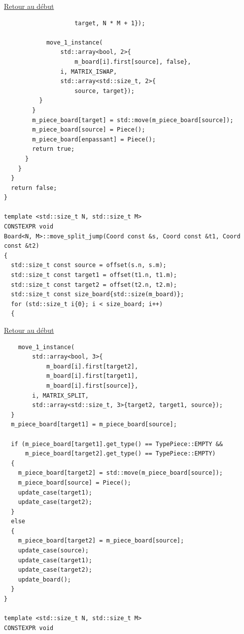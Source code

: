 {\begin{frame}[fragile]
\hyperlink{conclusion}{Retour au début}\newline
\begin{verbatim}
                    target, N * M + 1});

            move_1_instance(
                std::array<bool, 2>{
                    m_board[i].first[source], false},
                i, MATRIX_ISWAP,
                std::array<std::size_t, 2>{
                    source, target});
          }
        }
        m_piece_board[target] = std::move(m_piece_board[source]);
        m_piece_board[source] = Piece();
        m_piece_board[enpassant] = Piece();
        return true;
      }
    }
  }
  return false;
}

template <std::size_t N, std::size_t M>
CONSTEXPR void
Board<N, M>::move_split_jump(Coord const &s, Coord const &t1, Coord const &t2)
{
  std::size_t const source = offset(s.n, s.m);
  std::size_t const target1 = offset(t1.n, t1.m);
  std::size_t const target2 = offset(t2.n, t2.m);
  std::size_t const size_board{std::size(m_board)};
  for (std::size_t i{0}; i < size_board; i++)
  {
\end{verbatim}
\end{frame}

\begin{frame}[fragile]
\hyperlink{conclusion}{Retour au début}\newline
\begin{verbatim}
    move_1_instance(
        std::array<bool, 3>{
            m_board[i].first[target2],
            m_board[i].first[target1],
            m_board[i].first[source]},
        i, MATRIX_SPLIT,
        std::array<std::size_t, 3>{target2, target1, source});
  }
  m_piece_board[target1] = m_piece_board[source];

  if (m_piece_board[target1].get_type() == TypePiece::EMPTY &&
      m_piece_board[target2].get_type() == TypePiece::EMPTY)
  {
    m_piece_board[target2] = std::move(m_piece_board[source]);
    m_piece_board[source] = Piece();
    update_case(target1);
    update_case(target2);
  }
  else
  {
    m_piece_board[target2] = m_piece_board[source];
    update_case(source);
    update_case(target1);
    update_case(target2);
    update_board();
  }
}

template <std::size_t N, std::size_t M>
CONSTEXPR void
\end{verbatim}
\end{frame}

}
